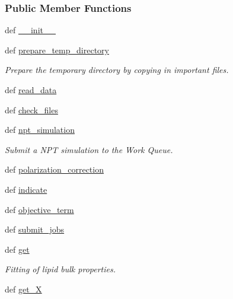 \subsubsection*{Public Member Functions}
\begin{DoxyCompactItemize}
\item 
def \hyperlink{classforcebalance_1_1lipid_1_1Lipid_a5db416f8b7a1a15ad0fd0ba28a113a65}{\-\_\-\-\_\-init\-\_\-\-\_\-}
\item 
def \hyperlink{classforcebalance_1_1lipid_1_1Lipid_ada28e39f54dc19403da5bb5aa97321d8}{prepare\-\_\-temp\-\_\-directory}
\begin{DoxyCompactList}\small\item\em Prepare the temporary directory by copying in important files. \end{DoxyCompactList}\item 
def \hyperlink{classforcebalance_1_1lipid_1_1Lipid_acd7058d950b65b20a25a97ebc6ad5973}{read\-\_\-data}
\item 
def \hyperlink{classforcebalance_1_1lipid_1_1Lipid_a37720af9570784f8ecd47ee9a76ba93b}{check\-\_\-files}
\item 
def \hyperlink{classforcebalance_1_1lipid_1_1Lipid_ade4fa56d07269b34736f6a06e0cc8237}{npt\-\_\-simulation}
\begin{DoxyCompactList}\small\item\em Submit a N\-P\-T simulation to the Work Queue. \end{DoxyCompactList}\item 
def \hyperlink{classforcebalance_1_1lipid_1_1Lipid_a95a7bd274403cfbc71cfed24d3939112}{polarization\-\_\-correction}
\item 
def \hyperlink{classforcebalance_1_1lipid_1_1Lipid_adf7931b8fae0e40b02ff7b79ff7433f0}{indicate}
\item 
def \hyperlink{classforcebalance_1_1lipid_1_1Lipid_ae7c62e18f1281543ee8a627261406626}{objective\-\_\-term}
\item 
def \hyperlink{classforcebalance_1_1lipid_1_1Lipid_a245fcbc89c3f2f83200843a8d2578423}{submit\-\_\-jobs}
\item 
def \hyperlink{classforcebalance_1_1lipid_1_1Lipid_acfd2b5c694d9617343ba39320ecd1226}{get}
\begin{DoxyCompactList}\small\item\em Fitting of lipid bulk properties. \end{DoxyCompactList}\item 
def \hyperlink{classforcebalance_1_1target_1_1Target_a606dd136f195c267c05a2455405e5949}{get\-\_\-\-X}

\end{DoxyCompactItemize}
